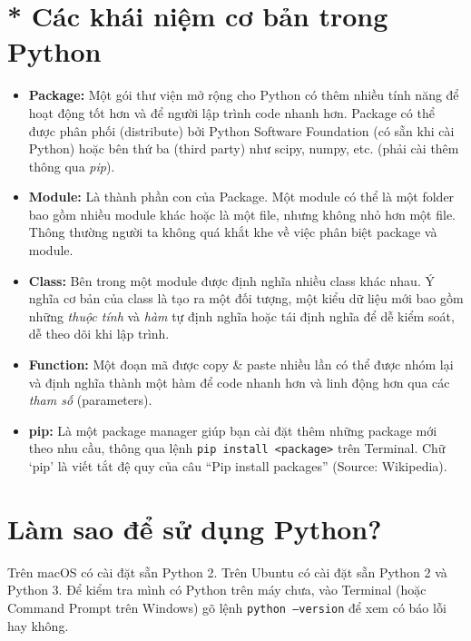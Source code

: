 \documentclass[12pt, a4paper, twoside]{article}
\begin{document}
\section{* Các khái niệm cơ bản trong Python}
\begin{itemize}
    \item \textbf{Package:} Một gói thư viện mở rộng cho Python có thêm nhiều tính năng để hoạt động tốt hơn và để người lập trình code nhanh hơn. Package có thể được phân phối (distribute) bởi Python Software Foundation (có sẵn khi cài Python) hoặc bên thứ ba (third party) như scipy, numpy, etc. (phải cài thêm thông qua \textit{pip}).
    \item \textbf{Module:} Là thành phần con của Package. Một module có thể là một folder bao gồm nhiều module khác hoặc là một file, nhưng không nhỏ hơn một file. Thông thường người ta không quá khắt khe về việc phân biệt package và module.
    \item \textbf{Class:} Bên trong một module được định nghĩa nhiều class khác nhau. Ý nghĩa cơ bản của class là tạo ra một đối tượng, một kiểu dữ liệu mới bao gồm những \textit{thuộc tính} và \textit{hàm} tự định nghĩa hoặc tái định nghĩa để dễ kiểm soát, dễ theo dõi khi lập trình.
    \item \textbf{Function:} Một đoạn mã được copy \& paste nhiều lần có thể được nhóm lại và định nghĩa thành một hàm để code nhanh hơn và linh động hơn qua các \textit{tham số} (parameters).
    \item \textbf{pip:} Là một package manager giúp bạn cài đặt thêm những package mới theo nhu cầu, thông qua lệnh \texttt{pip install <package>} trên Terminal. Chữ `pip' là viết tắt đệ quy của câu ``Pip install packages'' (Source: Wikipedia).
\end{itemize}
\section{Làm sao để sử dụng Python?}
Trên macOS có cài đặt sẵn Python 2. Trên Ubuntu có cài đặt sẵn Python 2 và Python 3. Để kiểm tra mình có Python trên máy chưa, vào Terminal (hoặc Command Prompt trên Windows) gõ lệnh \texttt{python --version} để xem có báo lỗi hay không.
\end{document}
